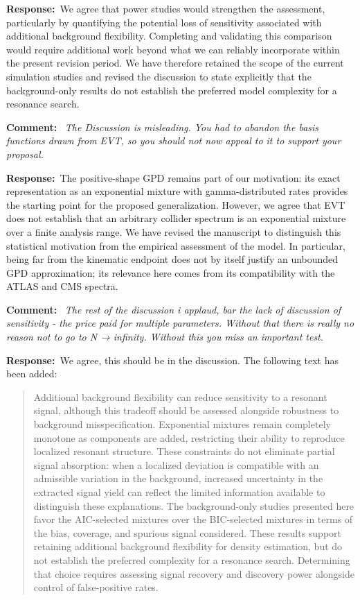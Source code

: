 \documentclass[11pt,a4paper]{article}
\newcommand{\refcomment}[1]{%
    \medskip\noindent\textbf{\color{refcolor}Comment:}\ %
    {\itshape #1}\par\smallskip
}
\newcommand{\response}{\noindent\textbf{Response:}\ }
\newcommand{\addedtext}[1]{%
    \smallskip\begin{quote}\color{quotecolor}\small #1\end{quote}\smallskip
}
\begin{document}
\response We agree that power studies would strengthen the assessment, particularly by quantifying the potential loss of sensitivity associated with additional background flexibility. Completing and validating this comparison would require additional work beyond what we can reliably incorporate within the present revision period. We have therefore retained the scope of the current simulation studies and revised the discussion to state explicitly that the background-only results do not establish the preferred model complexity for a resonance search.

\refcomment{The Discussion is misleading. You had to abandon the basis functions drawn from EVT, so you should not now appeal to it to support your proposal.}
\response The positive-shape GPD remains part of our motivation: its exact representation as an exponential mixture with gamma-distributed rates provides the starting point for the proposed generalization. However, we agree that EVT does not establish that an arbitrary collider spectrum is an exponential mixture over a finite analysis range. We have revised the manuscript to distinguish this statistical motivation from the empirical assessment of the model. In particular, being far from the kinematic endpoint does not by itself justify an unbounded GPD approximation; its relevance here comes from its compatibility with the ATLAS and CMS spectra.

\refcomment{The rest of the discussion i applaud, bar the lack of discussion of sensitivity
- the price paid for multiple parameters. Without that there is really no
reason not to go to N → infinity. Without this you miss an important test.}
\response We agree, this should be in the discussion. The following text has been added:
\addedtext{
Additional background flexibility can reduce sensitivity to a resonant signal, although this tradeoff should be assessed alongside robustness to background misspecification. Exponential mixtures remain completely monotone as components are added, restricting their ability to reproduce localized resonant structure. These constraints do not eliminate partial signal absorption: when a localized deviation is compatible with an admissible variation in the background, increased uncertainty in the extracted signal yield can reflect the limited information available to distinguish these explanations. The background-only studies presented here favor the AIC-selected mixtures over the BIC-selected mixtures in terms of the bias, coverage, and spurious signal considered. These results support retaining additional background flexibility for density estimation, but do not establish the preferred complexity for a resonance search. Determining that choice requires assessing signal recovery and discovery power alongside control of false-positive rates.
}
\end{document}
